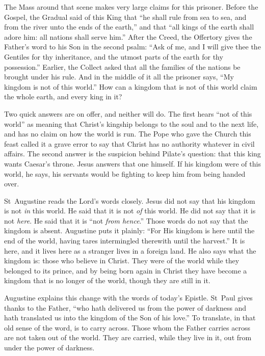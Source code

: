 The Mass around that scene makes very large claims for this prisoner. Before
the Gospel, the Gradual said of this King that ``he shall rule from sea to
sea, and from the river unto the ends of the earth,'' and that ``all kings of
the earth shall adore him: all nations shall serve him.'' After the Creed, the
Offertory gives the Father's word to his Son in the second psalm: ``Ask of me,
and I will give thee the Gentiles for thy inheritance, and the utmost parts of
the earth for thy possession.'' Earlier, the Collect asked that all the
families of the nations be brought under his rule. And in the
middle of it all the prisoner says, ``My kingdom is not of this world.'' How
can a kingdom that is not of this world claim the whole earth, and every king
in it?

\medskip

Two quick answers are on offer, and neither will do. The first hears ``not of
this world'' as meaning that Christ's kingship belongs to the soul and to the
next life, and has no claim on how the world is run. The Pope who gave the
Church this feast called it a grave error to say that Christ has no authority
whatever in civil affairs. The second answer is the suspicion behind Pilate's
question: that this king wants Caesar's throne. Jesus answers that one
himself. If his kingdom were of this world, he says, his servants would be
fighting to keep him from being handed over.

St~Augustine reads the Lord's words closely. Jesus did not say that his
kingdom is not \emph{in} this world. He said that it is not \emph{of} this
world. He did not say that it is not \emph{here}. He said that it is ``not
\emph{from hence}.'' Those words do not say that the kingdom is absent.
Augustine puts it plainly: ``For His kingdom is
here until the end of the world, having tares intermingled therewith until
the harvest.'' It is here, and it lives
here as a stranger lives in a foreign land. He also says what the kingdom is:
those who believe in Christ. They were of the world while they belonged to its
prince, and by being born again in Christ they have become a kingdom that is
no longer of the world, though they are still in it.

Augustine explains this change with the words of today's Epistle. St~Paul
gives thanks to the Father, ``who hath delivered us from the power of darkness
and hath translated us into the kingdom of the Son of his love.'' To
translate, in that old sense of the word, is to carry across. Those whom the
Father carries across are not taken out of the world. They are carried, while
they live in it, out from under the power of darkness.

